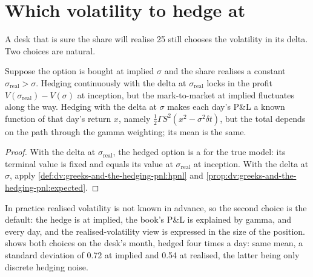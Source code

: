 \section{Which volatility to hedge at}

A desk that is sure the share will realise 25 still chooses the volatility in its
delta. Two choices are natural.

\begin{proposition}\label{prop:dv:greeks-and-the-hedging-pnl:which}
Suppose the option is bought at implied $\sigma$ and the share realises a constant
$\sigma_{\mathrm{real}}>\sigma$. Hedging continuously with the delta at
$\sigma_{\mathrm{real}}$ locks in the profit $V(\sigma_{\mathrm{real}})-V(\sigma)$ at
inception, but the mark-to-market at implied fluctuates along the way. Hedging with
the delta at $\sigma$ makes each day's P\&L a known function of that day's return
$x$, namely $\tfrac12\Gamma S^2(x^2-\sigma^2\delta t)$, but the total depends on
the path through the gamma weighting; its mean is the same.
\end{proposition}
\begin{proof}
With the delta at $\sigma_{\mathrm{real}}$, the hedged option is a  for the true model: its terminal value is fixed and equals its value at
$\sigma_{\mathrm{real}}$ at inception. With the delta at $\sigma$, apply
\cref{def:dv:greeks-and-the-hedging-pnl:hpnl} and
\cref{prop:dv:greeks-and-the-hedging-pnl:expected}.
\end{proof}

In practice realised volatility is not known in advance, so the second choice is
the default: the hedge is at implied, the book's P\&L is explained by gamma,
 and  every day, and the realised-volatility view is expressed in the size
of the position.  shows both choices
on the desk's month, hedged four times a day: same mean, a standard deviation of
0.72 at implied and 0.54 at realised, the latter being only discrete hedging noise.

